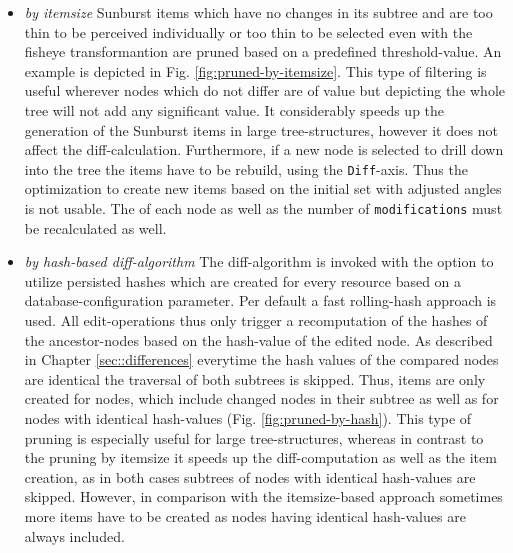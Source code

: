 
\begin{itemize}
\item \emph{by itemsize} Sunburst items which have no changes in its subtree and are too thin to be perceived individually or too thin to be selected even with the fisheye transformantion are pruned based on a predefined threshold-value. An example is depicted in Fig. \ref{fig:pruned-by-itemsize}. This type of filtering is useful wherever nodes which do not differ are of value but depicting the whole tree will not add any significant value. It considerably speeds up the generation of the Sunburst items in large tree-structures, however it does not affect the diff-calculation. Furthermore, if a new node is selected to drill down into the tree the items have to be rebuild, using the \texttt{Diff}-axis. Thus the optimization to create new items based on the initial set with adjusted angles is not usable. The  of each node as well as the number of \texttt{modifications} must be recalculated as well. 


\item \emph{by hash-based diff-algorithm} The diff-algorithm is invoked with the option to utilize persisted hashes which are created for every resource based on a database-configuration parameter. Per default a fast rolling-hash approach is used. All edit-operations thus only trigger a recomputation of the hashes of the ancestor-nodes based on the hash-value of the edited node. As described in Chapter \ref{sec::differences} everytime the hash values of the compared nodes are identical the traversal of both subtrees is skipped. Thus, items are only created for nodes, which include changed nodes in their subtree as well as for nodes with identical hash-values (Fig. \ref{fig:pruned-by-hash}). This type of pruning is especially useful for large tree-structures, whereas in contrast to the pruning by itemsize it speeds up the diff-computation as well as the item creation, as in both cases subtrees of nodes with identical hash-values are skipped. However, in comparison with the itemsize-based approach sometimes more items have to be created as nodes having identical hash-values are always included.


\end{itemize}
